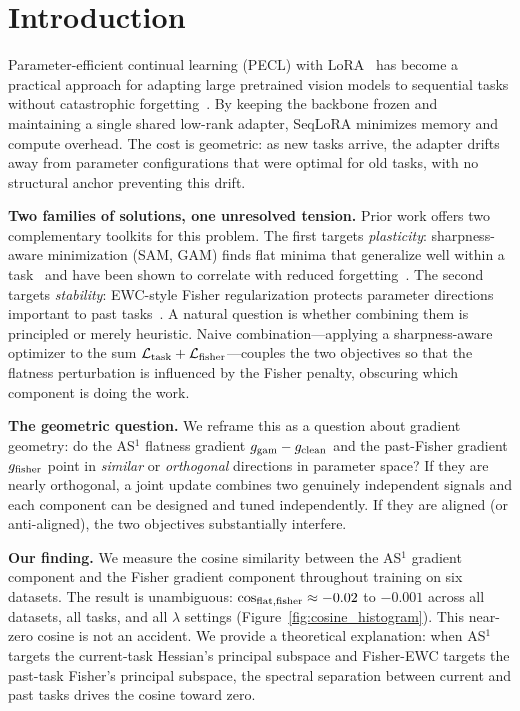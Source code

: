 \section{Introduction}
\label{sec:intro}

Parameter-efficient continual learning (PECL) with LoRA~\citep{hu2022lora} has become a practical
approach for adapting large pretrained vision models to sequential tasks without catastrophic
forgetting~\citep{Wang_2022_CVPR,Gao_2023_ICCV,Smith2023CODA}.
By keeping the backbone frozen and maintaining a single shared low-rank adapter,
SeqLoRA minimizes memory and compute overhead.
The cost is geometric: as new tasks arrive, the adapter drifts away from parameter configurations
that were optimal for old tasks, with no structural anchor preventing this drift.

\textbf{Two families of solutions, one unresolved tension.}
Prior work offers two complementary toolkits for this problem.
The first targets \emph{plasticity}: sharpness-aware minimization (SAM, GAM)
finds flat minima that generalize well within a task~\citep{foretSharpnessAwareMinimizationEfficiently2021,
zhengGradientAwareminimizationDistributed2021} and have been shown to correlate with
reduced forgetting~\citep{NEURIPS2020_518a38cc,shiOvercomingCatastrophicForgetting2021}.
The second targets \emph{stability}: EWC-style Fisher regularization
protects parameter directions important to past tasks~\citep{EWC2017,zheng2025ewclora}.
A natural question is whether combining them is principled or merely heuristic.
Naive combination---applying a sharpness-aware optimizer to the sum
$\mathcal{L}_{\mathrm{task}} + \mathcal{L}_{\mathrm{fisher}}$---couples the two objectives so that the flatness perturbation
is influenced by the Fisher penalty, obscuring which component is doing the work.

\textbf{The geometric question.}
We reframe this as a question about gradient geometry:
do the AS$^1$ flatness gradient $g_{\mathrm{gam}} - g_{\mathrm{clean}}$ and the past-Fisher gradient $g_{\mathrm{fisher}}$
point in \emph{similar} or \emph{orthogonal} directions in parameter space?
If they are nearly orthogonal, a joint update combines two genuinely independent signals
and each component can be designed and tuned independently.
If they are aligned (or anti-aligned), the two objectives substantially interfere.

\textbf{Our finding.}
We measure the cosine similarity between the AS$^1$ gradient component
and the Fisher gradient component throughout training on six datasets.
The result is unambiguous: $\cos_{\mathrm{flat,fisher}} \approx -0.02$ to $-0.001$ across all datasets,
all tasks, and all $\lambda$ settings (Figure~\ref{fig:cosine_histogram}).
This near-zero cosine is not an accident.
We provide a theoretical explanation: when AS$^1$ targets the current-task Hessian's
principal subspace and Fisher-EWC targets the past-task Fisher's principal subspace,
the spectral separation between current and past tasks drives the cosine toward zero.

